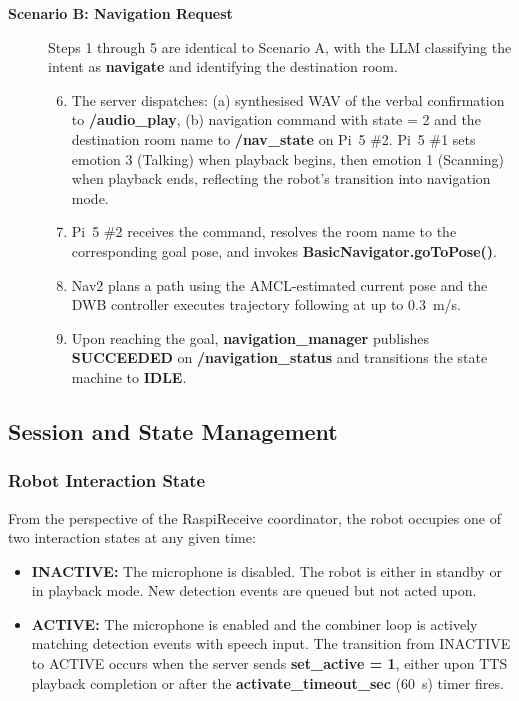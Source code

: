 \begin{description}
    \item[\textbf{Scenario B: Navigation Request}]
    Steps 1 through 5 are identical to Scenario A, with the LLM classifying the intent as \textbf{navigate} and identifying the destination room.
    
    \begin{enumerate}
        \setcounter{enumi}{5}
        \item The server dispatches: (a) synthesised WAV of the verbal confirmation to \textbf{/audio\_play}, (b) navigation command with state = 2 and the destination room name to \textbf{/nav\_state} on Pi~5 \#2. Pi~5 \#1 sets emotion 3 (Talking) when playback begins, then emotion 1 (Scanning) when playback ends, reflecting the robot's transition into navigation mode.

        \item Pi~5 \#2 receives the command, resolves the room name to the corresponding goal pose, and invokes \textbf{BasicNavigator.goToPose()}.

        \item Nav2 plans a path using the AMCL-estimated current pose and the DWB controller executes trajectory following at up to 0.3~m/s.

        \item Upon reaching the goal, \textbf{navigation\_manager} publishes \textbf{SUCCEEDED} on \textbf{/navigation\_status} and transitions the state machine to \textbf{IDLE}.
    \end{enumerate}
\end{description}

\subsection{Session and State Management}

\subsubsection{Robot Interaction State}

From the perspective of the RaspiReceive coordinator, the robot occupies one of two interaction states at any given time:

\begin{itemize}
    \item \textbf{INACTIVE:} The microphone is disabled. The robot is either in standby or in playback mode. New detection events are queued but not acted upon.

    \item \textbf{ACTIVE:} The microphone is enabled and the combiner loop is actively matching detection events with speech input. The transition from INACTIVE to ACTIVE occurs when the server sends \textbf{set\_active = 1}, either upon TTS playback completion or after the \textbf{activate\_timeout\_sec} (60~s) timer fires.
\end{itemize}

